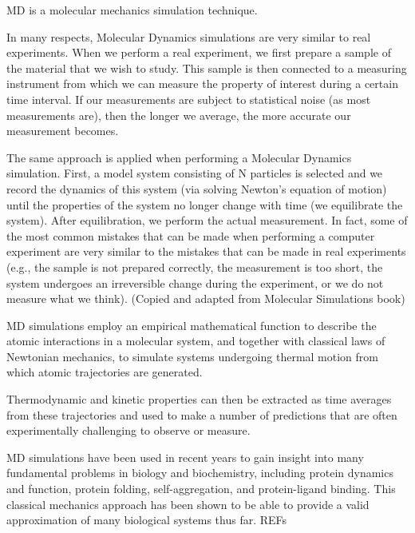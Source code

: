 MD is a molecular mechanics simulation technique.

In many respects, Molecular Dynamics simulations are very similar to real experiments. When we perform a real experiment, we first prepare a sample of the material that we wish to study. This sample is then connected to a measuring instrument from which we can measure the property of interest during a certain time interval. If our measurements are subject to statistical noise (as most measurements are), then the longer we average, the more accurate our measurement becomes. 

The same approach is applied when performing a Molecular Dynamics simulation. First, a model system consisting of N particles is selected and we record the dynamics of this system (via solving Newton's equation of motion) until the properties of the system no longer change with time (we equilibrate the system).  After equilibration, we perform the actual measurement. In fact, some of the most common mistakes that can be made when performing a computer experiment are very similar to the mistakes that can be made in real experiments (e.g., the sample is not prepared correctly, the measurement is too short, the system undergoes an irreversible change during the experiment, or we do not measure what we think). (Copied and adapted from Molecular Simulations book)

MD simulations employ an empirical mathematical function to describe the atomic interactions in a molecular system, and together with classical laws of Newtonian mechanics, to simulate systems undergoing thermal motion from which atomic trajectories are generated. 

Thermodynamic and kinetic properties can then be extracted as time averages from these trajectories and used to make a number of predictions that are often experimentally challenging to observe or measure.

MD simulations have been used in recent years to gain insight into many fundamental problems in biology and biochemistry, including protein dynamics and function, protein folding, self-aggregation, and protein-ligand binding. This classical mechanics approach has been shown to be able to provide a valid approximation of many biological systems thus far. REFs
